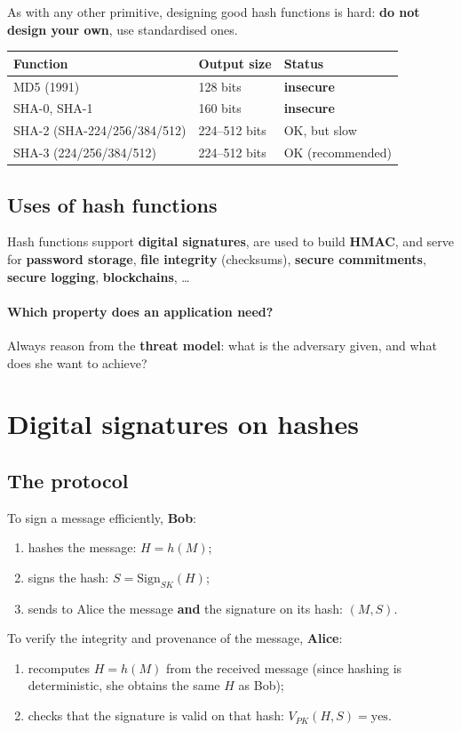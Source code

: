 As with any other primitive, designing good hash functions is hard: \textbf{do not design your own}, use standardised ones.
\begin{center}
\begin{tabular}{@{}lll@{}}
\toprule
\textbf{Function} & \textbf{Output size} & \textbf{Status} \\
\midrule
MD5 (1991) & 128 bits & \textbf{insecure} \\
SHA-0, SHA-1 & 160 bits & \textbf{insecure} \\
SHA-2 (SHA-224/256/384/512) & 224--512 bits & OK, but slow \\
SHA-3 (224/256/384/512) & 224--512 bits & OK (recommended) \\
\bottomrule
\end{tabular}
\end{center}

\subsection{Uses of hash functions}

Hash functions support \textbf{digital signatures}, are used to build \textbf{HMAC}, and serve for \textbf{password storage}, \textbf{file integrity} (checksums), \textbf{secure commitments}, \textbf{secure logging}, \textbf{blockchains}, \dots

\paragraph{Which property does an application need?} Always reason from the \textbf{threat model}: what is the adversary given, and what does she want to achieve?

\section{Digital signatures on hashes}

\subsection{The protocol}

To sign a message efficiently, \textbf{Bob}:
\begin{enumerate}
    \item hashes the message: $H = h(M)$;
    \item signs the hash: $S = \mathrm{Sign}_{SK}(H)$;
    \item sends to Alice the message \textbf{and} the signature on its hash: $(M, S)$.
\end{enumerate}
To verify the integrity and provenance of the message, \textbf{Alice}:
\begin{enumerate}
    \item recomputes $H = h(M)$ from the received message (since hashing is deterministic, she obtains the same $H$ as Bob);
    \item checks that the signature is valid on that hash: $V_{PK}(H, S) = \text{yes}$.
\end{enumerate}

